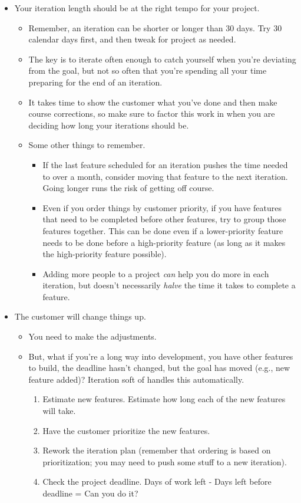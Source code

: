 \documentclass[letterpaper]{article}
\begin{document}
\begin{itemize}
    \item Your iteration length should be at the right tempo for your project. 
    \begin{itemize}
        \item Remember, an iteration can be shorter or longer than 30 days. Try 30 calendar days first, and then tweak for project as needed. 
        \item The key is to iterate often enough to catch yourself when you're deviating from the goal, but not so often that you're spending all your time preparing for the end of an iteration. 
        \item It takes time to show the customer what you've done and then make course corrections, so make sure to factor this work in when you are deciding how long your iterations should be. 
        \item Some other things to remember. 
        \begin{itemize}
            \item If the last feature scheduled for an iteration pushes the time needed to over a month, consider moving that feature to the next iteration. Going longer runs the risk of getting off course. 
            \item Even if you order things by customer priority, if you have features that need to be completed before other features, try to group those features together. This can be done even if a lower-priority feature needs to be done before a high-priority feature (as long as it makes the high-priority feature possible). 
            \item Adding more people to a project \emph{can} help you do more in each iteration, but doesn't necessarily \emph{halve} the time it takes to complete a feature. 
        \end{itemize}
    \end{itemize}

    \item The customer will change things up. 
    \begin{itemize}
        \item You need to make the adjustments. 
        \item But, what if you're a long way into development, you have other features to build, the deadline hasn't changed, but the goal has moved (e.g., new feature added)? Iteration soft of handles this automatically. 
        \begin{enumerate}
            \item Estimate new features. Estimate how long each of the new features will take. 
            \item Have the customer prioritize the new features. 
            \item Rework the iteration plan (remember that ordering is based on prioritization; you may need to push some stuff to a new iteration). 
            \item Check the project deadline. Days of work left - Days left before deadline = Can you do it? 
        \end{enumerate}
    \end{itemize}


\end{itemize}
\end{document}
